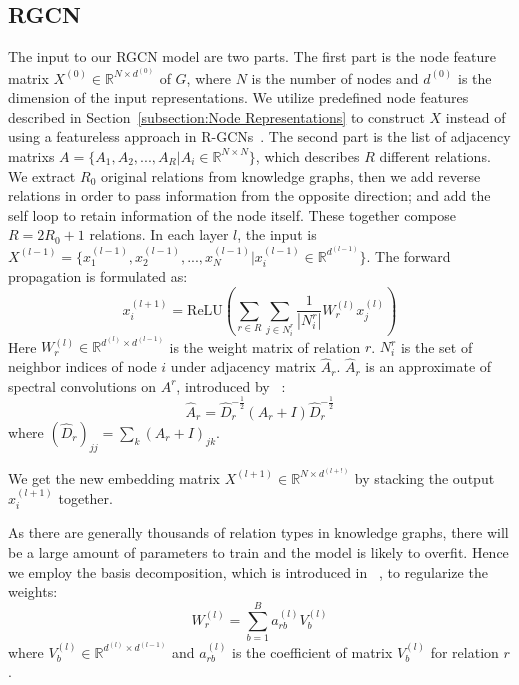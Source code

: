 	\subsection{RGCN}
	\label{section:rgcn}
	The input to our RGCN model are two parts. The first part is the node feature matrix $X^{(0)} \in \mathbb{R}^{N \times d^{(0)}}$ of $G$, where $N$ is the number of nodes and $d^{(0)}$ is the dimension of the input representations. We utilize predefined node features described in Section~\ref{subsection:Node Representations} to construct $X$ instead of using a featureless approach in R-GCNs~\cite{Schlichtkrull2017Modeling}. 
	The second part is the list of adjacency matrixs $A=\{A_1,A_2,...,A_R |A_i \in \mathbb{R}^{N \times N} \}$, which describes $R$ different relations. We extract $R_0$ original relations from knowledge graphs, then we add reverse relations in order to pass information from the opposite direction; and add the self loop to retain information of the node itself. These together compose $R=2R_0+1$ relations.
	In each layer $l$, the input is $X^{(l-1)} = \{x^{(l-1)}_1,x^{(l-1)}_2,...,x^{(l-1)}_{N} |x^{(l-1)}_{i} \in \mathbb{R}^{d^{(l-1)}}\}$. The forward propagation is formulated as:
	\begin{equation}
	x_i^{(l+1)}=\mathrm{ReLU} (\sum\limits_{r \in R}\sum\limits_{j \in N_i^r} \frac{1}{|N_i^r|}W_r^{(l)}x_j^{(l)})
	\end{equation}
	Here $W_r^{(l)} \in \mathbb{R}^{d^{(l)} \times d^{(l-1)}}$ is the weight matrix of relation $r$. $N_i^r$ is the set of neighbor indices of node $i$ under adjacency matrix $\hat A_r$. $\hat A_r$ is an approximate of spectral convolutions on $A^r$, introduced by ~\cite{Kipf2016Semi}:
	\begin{equation}
	\hat A_r=\hat D_r^{- \frac{1}{2}}(A_r+I)\hat D_r^{- \frac{1}{2}}
	\end{equation}
	where $(\hat D_r)_{jj}=\sum_k(A_r+I)_{jk}$.
	
	We get the new embedding matrix $X^{(l+1)} \in \mathbb{R}^{N \times d^{(l+!)}}$ by stacking the output $x_i^{(l+1)}$ together.
	
	As there are generally thousands of relation types in knowledge graphs, there will be a large amount of parameters to train and the model is likely to overfit. Hence we employ the basis decomposition, which is introduced in ~\cite{Schlichtkrull2017Modeling}, to regularize the weights:
	\begin{equation}
	W_r^{(l)}=\sum\limits_{b=1}^B a_{rb}^{(l)}V_b^{(l)}
	\end{equation}
	where $V_b^{(l)} \in \mathbb{R}^{d^{(l)} \times d^{(l-1)}}$ and $a_{rb}^{(l)}$ is the coefficient of matrix $V_b^{(l)}$ for relation $r$.
	
